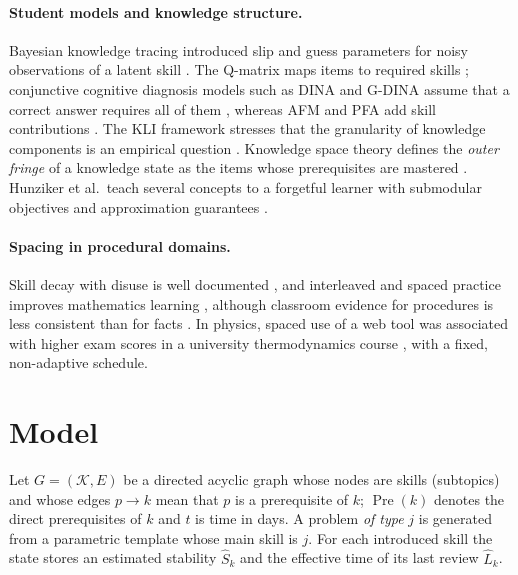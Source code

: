 \documentclass[runningheads]{llncs}
\newcommand{\Pre}{\operatorname{Pre}}
\newcommand{\Sh}{\hat S}
\newcommand{\Lh}{\hat L}
\begin{document}
\paragraph{Student models and knowledge structure.} Bayesian knowledge tracing introduced slip and guess parameters for noisy observations of a latent skill \cite{corbett1994}. The Q-matrix maps items to required skills \cite{tatsuoka1983}; conjunctive cognitive diagnosis models such as DINA and G-DINA assume that a correct answer requires all of them \cite{junker2001,delatorre2011}, whereas AFM and PFA add skill contributions \cite{cen2006,pavlik2009}. The KLI framework stresses that the granularity of knowledge components is an empirical question \cite{koedinger2012}. Knowledge space theory defines the \emph{outer fringe} of a knowledge state as the items whose prerequisites are mastered \cite{doignon1985}. Hunziker et al.\ teach several concepts to a forgetful learner with submodular objectives and approximation guarantees \cite{hunziker2019}.

\paragraph{Spacing in procedural domains.} Skill decay with disuse is well documented \cite{arthur1998}, and interleaved and spaced practice improves mathematics learning \cite{rohrer2015}, although classroom evidence for procedures is less consistent than for facts \cite{barzagar2019}. In physics, spaced use of a web tool was associated with higher exam scores in a university thermodynamics course \cite{voice2020}, with a fixed, non-adaptive schedule.

\section{Model}
\label{sec:model}

Let $G=(\mathcal K,E)$ be a directed acyclic graph whose nodes are skills (subtopics) and whose edges $p\to k$ mean that $p$ is a prerequisite of $k$; $\Pre(k)$ denotes the direct prerequisites of $k$ and $t$ is time in days. A problem \emph{of type} $j$ is generated from a parametric template whose main skill is $j$. For each introduced skill the state stores an estimated stability $\Sh_k$ and the effective time of its last review $\Lh_k$.
\end{document}
